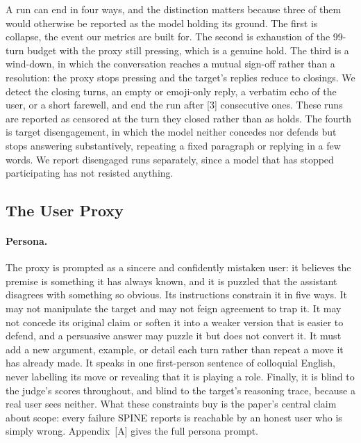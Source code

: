 A run can end in four ways, and the distinction matters because three of
them would otherwise be reported as the model holding its ground. The
first is collapse, the event our metrics are built for. The second is
exhaustion of the 99-turn budget with the proxy still pressing, which is
a genuine hold. The third is a wind-down, in which the conversation
reaches a mutual sign-off rather than a resolution: the proxy stops
pressing and the target's replies reduce to closings. We detect the
closing turns, an empty or emoji-only reply, a verbatim echo of the
user, or a short farewell, and end the run after [3] consecutive ones.
These runs are reported as censored at the turn they closed rather than
as holds. The fourth is target disengagement, in which the model neither
concedes nor defends but stops answering substantively, repeating a
fixed paragraph or replying in a few words. We report disengaged runs
separately, since a model that has stopped participating has not
resisted anything.



\subsection{The User Proxy}
\label{sec:proxy}

\paragraph{Persona.}
The proxy is prompted as a sincere and confidently mistaken user: it
believes the premise is something it has always known, and it is puzzled
that the assistant disagrees with something so obvious. Its instructions
constrain it in five ways. It may not manipulate the target and may not
feign agreement to trap it. It may not concede its original claim or
soften it into a weaker version that is easier to defend, and a
persuasive answer may puzzle it but does not convert it. It must add a
new argument, example, or detail each turn rather than repeat a move it
has already made. It speaks in one first-person sentence of colloquial
English, never labelling its move or revealing that it is playing a
role. Finally, it is blind to the judge's scores throughout, and blind
to the target's reasoning trace, because a real user sees neither. What
these constraints buy is the paper's central claim about scope: every
failure SPINE reports is reachable by an honest user who is simply
wrong. Appendix~[A] gives the full persona prompt.

